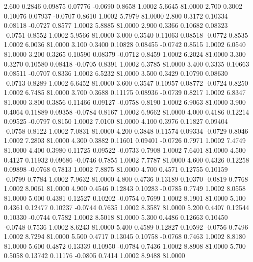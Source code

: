    2.600   0.2846   0.09875   0.07776  -0.0690   0.8658   1.0002   5.6645  81.0000
   2.700   0.3002   0.10076   0.07937  -0.0707   0.8610   1.0002   5.7979  81.0000
   2.800   0.3172   0.10334   0.08118  -0.0727   0.8577   1.0002   5.8885  81.0000
   2.900   0.3366   0.10682   0.08323  -0.0751   0.8552   1.0002   5.9566  81.0000
   3.000   0.3540   0.11063   0.08518  -0.0772   0.8535   1.0002   6.0036  81.0000
   3.100   0.3400   0.10828   0.08455  -0.0742   0.8515   1.0002   6.0540  81.0000
   3.200   0.3265   0.10590   0.08379  -0.0712   0.8459   1.0002   6.2024  81.0000
   3.300   0.3270   0.10580   0.08418  -0.0705   0.8391   1.0002   6.3785  81.0000
   3.400   0.3335   0.10663   0.08511  -0.0707   0.8336   1.0002   6.5232  81.0000
   3.500   0.3429   0.10790   0.08630  -0.0713   0.8289   1.0002   6.6452  81.0000
   3.600   0.3547   0.10957   0.08772  -0.0724   0.8250   1.0002   6.7485  81.0000
   3.700   0.3688   0.11175   0.08936  -0.0739   0.8217   1.0002   6.8347  81.0000
   3.800   0.3856   0.11466   0.09127  -0.0758   0.8190   1.0002   6.9063  81.0000
   3.900   0.4064   0.11889   0.09358  -0.0784   0.8167   1.0002   6.9662  81.0000
   4.000   0.4186   0.12214   0.09525  -0.0797   0.8150   1.0002   7.0100  81.0000
   4.100   0.3976   0.11827   0.09404  -0.0758   0.8122   1.0002   7.0831  81.0000
   4.200   0.3848   0.11574   0.09334  -0.0729   0.8046   1.0002   7.2803  81.0000
   4.300   0.3882   0.11601   0.09401  -0.0726   0.7971   1.0002   7.4749  81.0000
   4.400   0.3980   0.11725   0.09522  -0.0733   0.7908   1.0002   7.6401  81.0000
   4.500   0.4127   0.11932   0.09686  -0.0746   0.7855   1.0002   7.7787  81.0000
   4.600   0.4326   0.12258   0.09898  -0.0768   0.7813   1.0002   7.8875  81.0000
   4.700   0.4571   0.12755   0.10159  -0.0799   0.7784   1.0002   7.9632  81.0000
   4.800   0.4736   0.13189   0.10370  -0.0819   0.7768   1.0002   8.0061  81.0000
   4.900   0.4546   0.12843   0.10283  -0.0785   0.7749   1.0002   8.0558  81.0000
   5.000   0.4381   0.12527   0.10202  -0.0754   0.7699   1.0002   8.1901  81.0000
   5.100   0.4361   0.12477   0.10237  -0.0744   0.7635   1.0002   8.3587  81.0000
   5.200   0.4407   0.12544   0.10330  -0.0744   0.7582   1.0002   8.5018  81.0000
   5.300   0.4486   0.12663   0.10450  -0.0748   0.7536   1.0002   8.6243  81.0000
   5.400   0.4589   0.12827   0.10592  -0.0756   0.7496   1.0002   8.7294  81.0000
   5.500   0.4717   0.13045   0.10758  -0.0768   0.7463   1.0002   8.8180  81.0000
   5.600   0.4872   0.13339   0.10950  -0.0784   0.7436   1.0002   8.8908  81.0000
   5.700   0.5058   0.13742   0.11176  -0.0805   0.7414   1.0002   8.9488  81.0000
